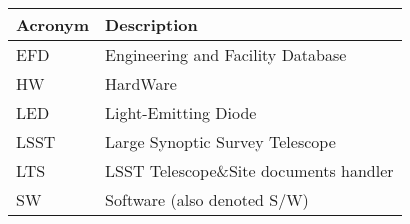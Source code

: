 \addtocounter{table}{-1}
\begin{longtable}{p{}p{}}\hline
\textbf{Acronym} & \textbf{Description}  \\\hline

EFD & Engineering and Facility Database \\\hline
HW & HardWare \\\hline
LED & Light-Emitting Diode \\\hline
LSST & Large Synoptic Survey Telescope \\\hline
LTS & LSST Telescope\&Site documents handler \\\hline
SW & Software (also denoted S/W) \\\hline
\end{longtable}
